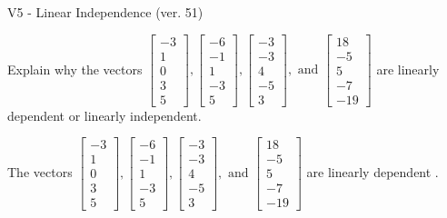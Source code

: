 \begin{exercise}
  \begin{exerciseTitle}V5 - Linear Independence (ver. 51)\end{exerciseTitle}
  \begin{exerciseStatement}
    Explain why the vectors \(\left[\begin{array}{r}
-3 \\
1 \\
0 \\
3 \\
5
\end{array}\right] , \left[\begin{array}{r}
-6 \\
-1 \\
1 \\
-3 \\
5
\end{array}\right] , \left[\begin{array}{r}
-3 \\
-3 \\
4 \\
-5 \\
3
\end{array}\right] , \text{ and } \left[\begin{array}{r}
18 \\
-5 \\
5 \\
-7 \\
-19
\end{array}\right]\) are linearly dependent or linearly independent.	


  \end{exerciseStatement}
  \begin{exerciseAnswer}
   The vectors \(\left[\begin{array}{r}
-3 \\
1 \\
0 \\
3 \\
5
\end{array}\right] , \left[\begin{array}{r}
-6 \\
-1 \\
1 \\
-3 \\
5
\end{array}\right] , \left[\begin{array}{r}
-3 \\
-3 \\
4 \\
-5 \\
3
\end{array}\right] , \text{ and } \left[\begin{array}{r}
18 \\
-5 \\
5 \\
-7 \\
-19
\end{array}\right]\) are 
  	 linearly dependent  .
  


  \end{exerciseAnswer}
\end{exercise}